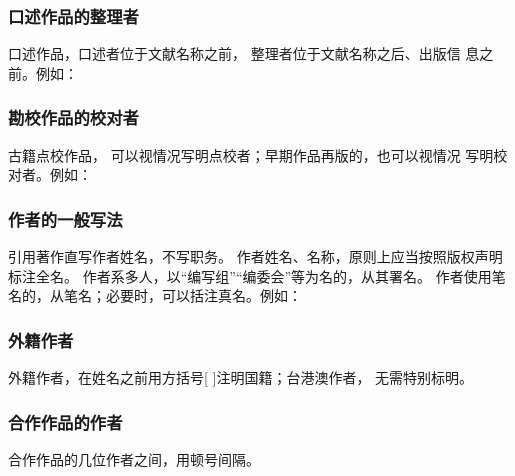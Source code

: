 \documentclass{article}
\begin{document}
\begin{quotation}



\end{quotation}


\subsubsection{口述作品的整理者}
口述作品，口述者位于文献名称之前， 整理者位于文献名称之后、出版信
息之前。例如：

\begin{quotation}
\end{quotation}

\subsubsection{勘校作品的校对者}
古籍点校作品， 可以视情况写明点校者；早期作品再版的，也可以视情况
写明校对者。例如：

\begin{quotation}
\end{quotation}

\subsubsection{作者的一般写法}

引用著作直写作者姓名，不写职务。 
作者姓名、名称，原则上应当按照版权声明标注全名。
作者系多人，以“编写组”“编委会”等为名的，从其署名。
作者使用笔名的，从笔名；必要时，可以括注真名。例如：

\begin{quotation}
\end{quotation}


\subsubsection{外籍作者}
外籍作者，在姓名之前用方括号[ ]注明国籍；台港澳作者， 无需特别标明。

\subsubsection{合作作品的作者}
合作作品的几位作者之间，用顿号间隔。

\begin{quotation}
\end{quotation}
\end{document}
